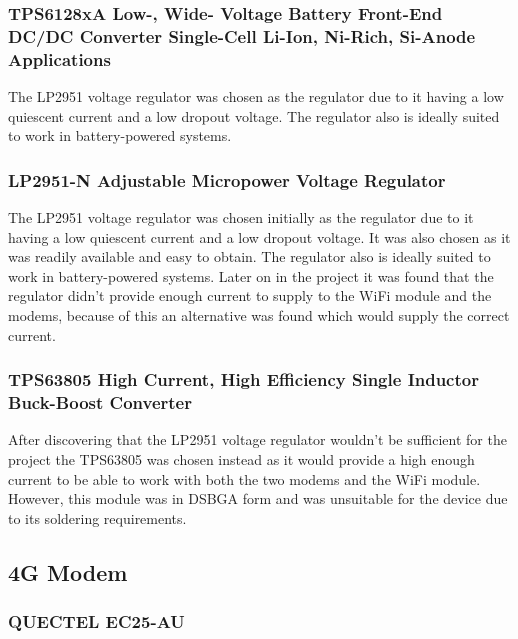 \subsubsection{TPS6128xA Low-, Wide- Voltage Battery Front-End DC/DC Converter Single-Cell Li-Ion, Ni-Rich, Si-Anode Applications}

The LP2951 voltage regulator was chosen as the regulator due to it having a low quiescent current and a low dropout voltage. The regulator also is ideally suited to work in battery-powered systems. 

\subsubsection{LP2951-N Adjustable Micropower Voltage Regulator}

The LP2951 voltage regulator was chosen initially as the regulator due to it having a low quiescent current and a low dropout voltage. 
It was also chosen as it was readily available and easy to obtain. 
The regulator also is ideally suited to work in battery-powered systems. 
Later on in the project it was found that the regulator didn't provide enough current to supply to the WiFi module and the modems, because of this an alternative was found which would supply the correct current.


\subsubsection{TPS63805 High Current, High Efficiency Single Inductor Buck-Boost Converter}

After discovering that the LP2951 voltage regulator wouldn't be sufficient for the project the TPS63805 was chosen instead as it would provide a high enough current to be able to work with both the two modems and the WiFi module. 
However, this module was in DSBGA form and was unsuitable for the device due to its soldering requirements. 



\subsection{4G Modem}
\subsubsection{ QUECTEL EC25-AU}

